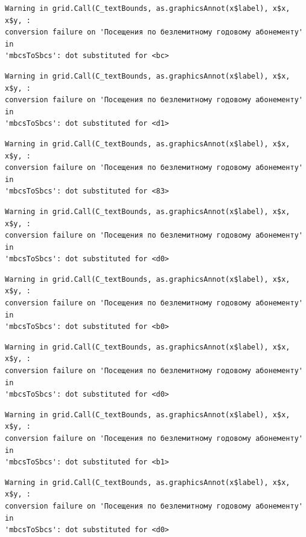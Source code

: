 \documentclass[
  letterpaper,
  DIV=11,
  numbers=noendperiod]{scrartcl}
\begin{document}
\begin{verbatim}
Warning in grid.Call(C_textBounds, as.graphicsAnnot(x$label), x$x, x$y, :
conversion failure on 'Посещения по безлемитному годовому абонементу' in
'mbcsToSbcs': dot substituted for <bc>
\end{verbatim}

\begin{verbatim}
Warning in grid.Call(C_textBounds, as.graphicsAnnot(x$label), x$x, x$y, :
conversion failure on 'Посещения по безлемитному годовому абонементу' in
'mbcsToSbcs': dot substituted for <d1>
\end{verbatim}

\begin{verbatim}
Warning in grid.Call(C_textBounds, as.graphicsAnnot(x$label), x$x, x$y, :
conversion failure on 'Посещения по безлемитному годовому абонементу' in
'mbcsToSbcs': dot substituted for <83>
\end{verbatim}

\begin{verbatim}
Warning in grid.Call(C_textBounds, as.graphicsAnnot(x$label), x$x, x$y, :
conversion failure on 'Посещения по безлемитному годовому абонементу' in
'mbcsToSbcs': dot substituted for <d0>
\end{verbatim}

\begin{verbatim}
Warning in grid.Call(C_textBounds, as.graphicsAnnot(x$label), x$x, x$y, :
conversion failure on 'Посещения по безлемитному годовому абонементу' in
'mbcsToSbcs': dot substituted for <b0>
\end{verbatim}

\begin{verbatim}
Warning in grid.Call(C_textBounds, as.graphicsAnnot(x$label), x$x, x$y, :
conversion failure on 'Посещения по безлемитному годовому абонементу' in
'mbcsToSbcs': dot substituted for <d0>
\end{verbatim}

\begin{verbatim}
Warning in grid.Call(C_textBounds, as.graphicsAnnot(x$label), x$x, x$y, :
conversion failure on 'Посещения по безлемитному годовому абонементу' in
'mbcsToSbcs': dot substituted for <b1>
\end{verbatim}

\begin{verbatim}
Warning in grid.Call(C_textBounds, as.graphicsAnnot(x$label), x$x, x$y, :
conversion failure on 'Посещения по безлемитному годовому абонементу' in
'mbcsToSbcs': dot substituted for <d0>
\end{verbatim}
\end{document}
